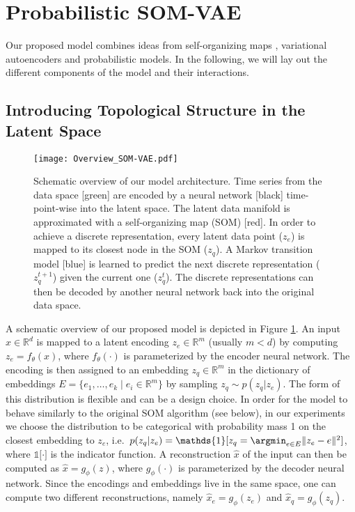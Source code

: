 \FloatBarrier

\section{Probabilistic SOM-VAE}

Our proposed model combines ideas from self-organizing maps \citep{Kohonen1998}, variational autoencoders \citep{Kingma2013} and probabilistic models.
In the following, we will lay out the different components of the model and their interactions.


\subsection{Introducing Topological Structure in the Latent Space} \label{sec:SOM-VAE}

\begin{figure}
    \centering
    \texttt{[image: Overview\_SOM-VAE.pdf]}
    \caption{Schematic overview of our model architecture. Time series from the data space [green] are encoded by a neural network [black] time-point-wise into the latent space. The latent data manifold is approximated with a self-organizing map (SOM) [red]. In order to achieve a discrete representation, every latent data point ($z_e$) is mapped to its closest node in the SOM ($z_q$). A Markov transition model [blue] is learned to predict the next discrete representation ($z_q^{t+1}$) given the current one ($z_q^t$). The discrete representations can then be decoded by another neural network back into the original data space.}
    \label{fig:overview}
\end{figure}


A schematic overview of our proposed model is depicted in Figure \ref{fig:overview}.
An input $x \in \mathbb{R}^d$ is mapped to a latent encoding $z_e \in \mathbb{R}^m$ (usually $m < d$) by computing $z_e = f_{\theta}(x)$, where $f_{\theta}(\cdot)$ is parameterized by the encoder neural network.
The encoding is then assigned to an embedding $z_q \in \mathbb{R}^m$ in the dictionary of embeddings $E = \lbrace e_1, \dots, e_k \; \vert \; e_i \in \mathbb{R}^m \rbrace$ by sampling $z_q \sim p(z_q | z_e)$.
The form of this distribution is flexible and can be a design choice.
In order for the model to behave similarly to the original SOM algorithm (see below), in our experiments we choose the distribution to be categorical with probability mass 1 on the closest embedding to $z_e$, i.e.\ $p(z_q | z_e) = \mathds{1} \lbrack z_q = \argmin_{e \in E} \| z_e - e\|^2 \rbrack$, where $\mathds{1} \lbrack \cdot \rbrack$ is the indicator function.
A reconstruction $\hat{x}$ of the input can then be computed as $\hat{x} = g_{\phi}(z)$, where $g_{\phi}(\cdot)$ is parameterized by the decoder neural network.
Since the encodings and embeddings live in the same space, one can compute two different reconstructions, namely $\hat{x}_e = g_{\phi}(z_e)$ and $\hat{x}_q = g_{\phi}(z_q)$.

